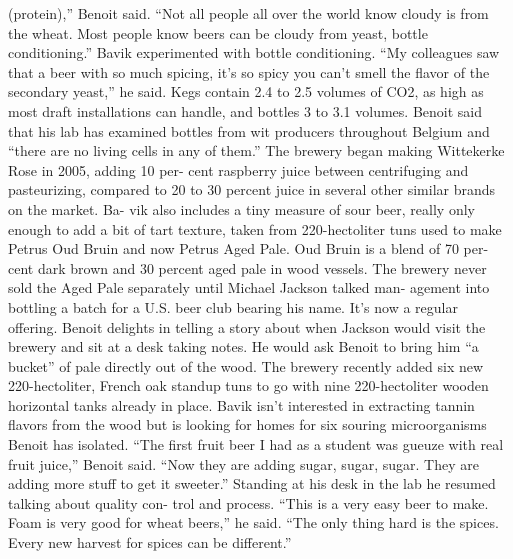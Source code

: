 \documentclass[a4paper,parskip=half]{scrartcl}
\begin{document}
(protein),” Benoit said. “Not all people all over the world know cloudy
is from the wheat. Most people know beers can be cloudy from yeast,
bottle conditioning.”
Bavik experimented with bottle conditioning. “My colleagues saw
that a beer with so much spicing, it’s so spicy you can’t smell the flavor of
the secondary yeast,” he said. Kegs contain 2.4 to 2.5 volumes of CO2, as
high as most draft installations can handle, and bottles 3 to 3.1 volumes.
Benoit said that his lab has examined bottles from wit producers
throughout Belgium and “there are no living cells in any of them.”
The brewery began making Wittekerke Rose in 2005, adding 10 per-
cent raspberry juice between centrifuging and pasteurizing, compared to
20 to 30 percent juice in several other similar brands on the market. Ba-
vik also includes a tiny measure of sour beer, really only enough to add
a bit of tart texture, taken from 220-hectoliter tuns used to make Petrus
Oud Bruin and now Petrus Aged Pale. Oud Bruin is a blend of 70 per-
cent dark brown and 30 percent aged pale in wood vessels. The brewery
never sold the Aged Pale separately until Michael Jackson talked man-
agement into bottling a batch for a U.S. beer club bearing his name. It’s
now a regular offering.
Benoit delights in telling a story about when Jackson would visit the
brewery and sit at a desk taking notes. He would ask Benoit to bring
him “a bucket” of pale directly out of the wood. The brewery recently
added six new 220-hectoliter, French oak standup tuns to go with nine
220-hectoliter wooden horizontal tanks already in place.
Bavik isn’t interested in extracting tannin flavors from the wood but
is looking for homes for six souring microorganisms Benoit has isolated.
“The first fruit beer I had as a student was gueuze with real fruit juice,”
Benoit said. “Now they are adding sugar, sugar, sugar. They are adding
more stuff to get it sweeter.”
Standing at his desk in the lab he resumed talking about quality con-
trol and process. “This is a very easy beer to make. Foam is very good
for wheat beers,” he said. “The only thing hard is the spices. Every new
harvest for spices can be different.”

\parencite[71]{Hieronymus2010}
\end{document}
